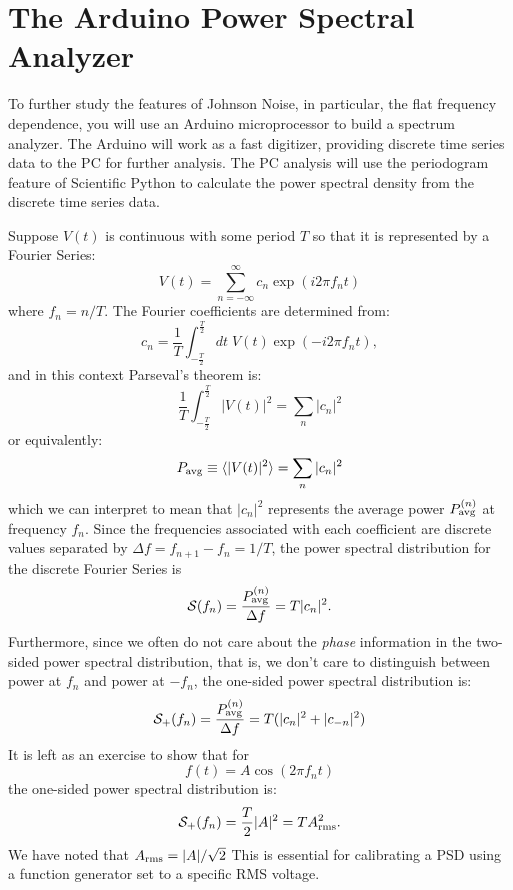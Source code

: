 \documentclass[12pt]{article}
\begin{document}
\section{The Arduino Power Spectral Analyzer}

To further study the features of Johnson Noise, in particular, the flat frequency dependence, you will use an Arduino microprocessor to build a spectrum analyzer.  The Arduino will work as a fast digitizer, providing discrete time series data to the PC for further analysis.  The PC analysis will use the periodogram feature of Scientific Python to calculate the power spectral density from the discrete time series data.  

Suppose $V(t)$ is continuous with some period $T$ so that it is represented by a Fourier Series:
\begin{displaymath}
V(t) = \sum_{n=-\infty}^{\infty} c_n \exp(i2\pi f_n t)
\end{displaymath}
where $f_n = n / T$.  The Fourier coefficients are determined from:
\begin{equation}
c_n = \frac{1}{T} \int_{-\frac{T}{2}}^{\frac{T}{2}} dt \; V(t) \exp(-i2\pi f_n t), \label{eqn:freqcoeff}
\end{equation}
and in this context Parseval's theorem is:
\begin{displaymath}
\frac{1}{T} \int_{-\frac{T}{2}}^{\frac{T}{2}} |V(t)|^2 = \sum_n |c_n|^2
\end{displaymath}
or equivalently:
\begin{displaymath}
P_{\rm avg} \equiv \braket{|V(t)|^2} = \sum_n |c_n|^2
\end{displaymath}
which we can interpret to mean that $|c_n|^2$ represents the average power $P_{\rm avg}^{(n)}$ at frequency $f_n$.  Since the frequencies associated with each coefficient are discrete values separated by $\Delta f = f_{n+1} - f_{n} = 1/T $, the power spectral distribution for the discrete Fourier Series is
\begin{displaymath}
\mathcal{S}(f_n) = \frac{P_{\rm avg}^{(n)}}{\Delta f} = T |c_n|^2.
\end{displaymath}
Furthermore, since we often do not care about the {\em phase} information in the two-sided power spectral distribution, that is, we don't care to distinguish between power at $f_n$ and power at $-f_n$, the one-sided power spectral distribution is:
\begin{equation}
\mathcal{S}_{+}(f_n) = \frac{P_{\rm avg}^{(n)}}{\Delta f} = T (|c_n|^2 + |c_{-n}|^2) \label{eqn:discretepsd}
\end{equation}
It is left as an exercise to show that for
\begin{displaymath}
f(t) = A \cos( 2 \pi f_n t)
\end{displaymath}
the one-sided power spectral distribution is:
\begin{equation}
\mathcal{S}_{+}(f_n) = \frac{T}{2} |A|^2  = T A^2_{\rm rms} \label{eqn:psdcalib}.
\end{equation}
We have noted that  $A_{\rm rms} = |A|/\sqrt{2}$  This is essential for calibrating a PSD using a function generator set to a specific RMS voltage.
\end{document}
